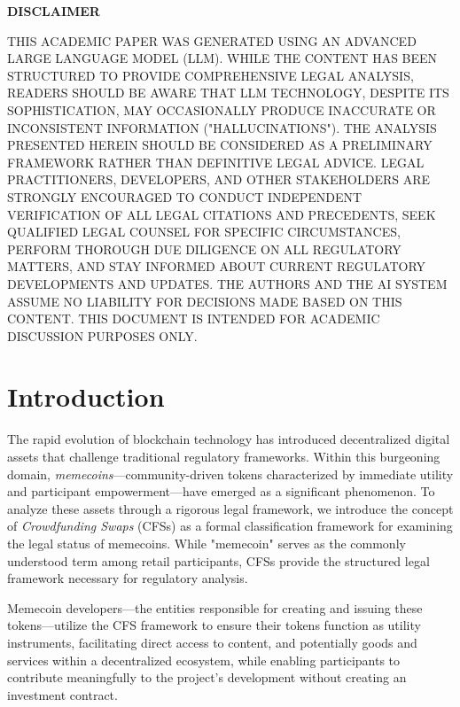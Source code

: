 \documentclass[a4paper,12pt]{article}
\begin{document}
\begin{center}
\begin{minipage}{0.9\textwidth}
\small
\begin{center}
\textbf{DISCLAIMER}
\end{center}
THIS ACADEMIC PAPER WAS GENERATED USING AN ADVANCED LARGE LANGUAGE MODEL (LLM). WHILE THE CONTENT HAS BEEN STRUCTURED TO PROVIDE COMPREHENSIVE LEGAL ANALYSIS, READERS SHOULD BE AWARE THAT LLM TECHNOLOGY, DESPITE ITS SOPHISTICATION, MAY OCCASIONALLY PRODUCE INACCURATE OR INCONSISTENT INFORMATION ("HALLUCINATIONS"). THE ANALYSIS PRESENTED HEREIN SHOULD BE CONSIDERED AS A PRELIMINARY FRAMEWORK RATHER THAN DEFINITIVE LEGAL ADVICE. LEGAL PRACTITIONERS, DEVELOPERS, AND OTHER STAKEHOLDERS ARE STRONGLY ENCOURAGED TO CONDUCT INDEPENDENT VERIFICATION OF ALL LEGAL CITATIONS AND PRECEDENTS, SEEK QUALIFIED LEGAL COUNSEL FOR SPECIFIC CIRCUMSTANCES, PERFORM THOROUGH DUE DILIGENCE ON ALL REGULATORY MATTERS, AND STAY INFORMED ABOUT CURRENT REGULATORY DEVELOPMENTS AND UPDATES. THE AUTHORS AND THE AI SYSTEM ASSUME NO LIABILITY FOR DECISIONS MADE BASED ON THIS CONTENT. THIS DOCUMENT IS INTENDED FOR ACADEMIC DISCUSSION PURPOSES ONLY.
\end{minipage}
\end{center}

\section{Introduction}
The rapid evolution of blockchain technology has introduced decentralized digital assets that challenge traditional regulatory frameworks. Within this burgeoning domain, \emph{memecoins}—community-driven tokens characterized by immediate utility and participant empowerment—have emerged as a significant phenomenon. To analyze these assets through a rigorous legal framework, we introduce the concept of \emph{Crowdfunding Swaps} (CFSs) as a formal classification framework for examining the legal status of memecoins. While "memecoin" serves as the commonly understood term among retail participants, CFSs provide the structured legal framework necessary for regulatory analysis.

Memecoin developers—the entities responsible for creating and issuing these tokens—utilize the CFS framework to ensure their tokens function as utility instruments, facilitating direct access to content, and potentially goods and services within a decentralized ecosystem, while enabling participants to contribute meaningfully to the project's development without creating an investment contract.
\end{document}
